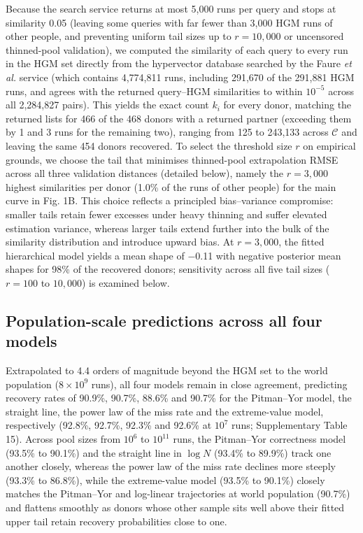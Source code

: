 \documentclass[11pt,a4paper]{article}
\begin{document}
Because the search service returns at most 5,000 runs per query and stops at similarity 0.05 (leaving some queries with far fewer than 3,000 HGM runs of other people, and preventing uniform tail sizes up to $r = 10{,}000$ or uncensored thinned-pool validation), we computed the similarity of each query to every run in the HGM set directly from the hypervector database searched by the Faure \textit{et al.} service (which contains 4,774,811 runs, including 291,670 of the 291,881 HGM runs, and agrees with the returned query--HGM similarities to within $10^{-5}$ across all 2,284,827 pairs). This yields the exact count $k_i$ for every donor, matching the returned lists for 466 of the 468 donors with a returned partner (exceeding them by 1 and 3 runs for the remaining two), ranging from 125 to 243,133 across $\mathcal{C}$ and leaving the same 454 donors recovered. To select the threshold size $r$ on empirical grounds, we choose the tail that minimises thinned-pool extrapolation RMSE across all three validation distances (detailed below), namely the $r = 3{,}000$ highest similarities per donor (1.0\% of the runs of other people) for the main curve in Fig. 1B. This choice reflects a principled bias--variance compromise: smaller tails retain fewer excesses under heavy thinning and suffer elevated estimation variance, whereas larger tails extend further into the bulk of the similarity distribution and introduce upward bias. At $r = 3{,}000$, the fitted hierarchical model yields a mean shape of $-$0.11 with negative posterior mean shapes for 98\% of the recovered donors; sensitivity across all five tail sizes ($r = 100$ to $10{,}000$) is examined below.

\subsection*{Population-scale predictions across all four models}

Extrapolated to 4.4 orders of magnitude beyond the HGM set to the world population ($8\times10^9$ runs), all four models remain in close agreement, predicting recovery rates of 90.9\%, 90.7\%, 88.6\% and 90.7\% for the Pitman--Yor model, the straight line, the power law of the miss rate and the extreme-value model, respectively (92.8\%, 92.7\%, 92.3\% and 92.6\% at $10^7$ runs; Supplementary Table 15). Across pool sizes from $10^6$ to $10^{11}$ runs, the Pitman--Yor correctness model (93.5\% to 90.1\%) and the straight line in $\log N$ (93.4\% to 89.9\%) track one another closely, whereas the power law of the miss rate declines more steeply (93.3\% to 86.8\%), while the extreme-value model (93.5\% to 90.1\%) closely matches the Pitman--Yor and log-linear trajectories at world population (90.7\%) and flattens smoothly as donors whose other sample sits well above their fitted upper tail retain recovery probabilities close to one.
\end{document}

